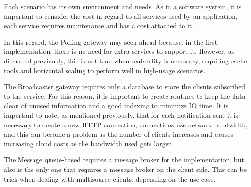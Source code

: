 Each scenario has its own environment and needs. As in a software system, it is important to consider the cost in regard to all services used by an application, each service requires maintenance and has a cost attached to it.

In this regard, the Polling gateway may seen ahead because, in the first implementation, there is no need for extra services to support it. However, as discussed previously, this is not true when scalability is necessary, requiring cache tools and horizontal scaling to perform well in high-usage scenarios.

The Broadcaster gateway requires only a database to store the clients subscribed to the service. For this reason, it is important to create routines to keep the data clean of unused information and a good indexing to minimize IO time. It is important to note, as mentioned previously, that for each notification sent it is necessary to create a new HTTP connection, connections use network bandwidth, and this can become a problem as the number of clients increases and causes increasing cloud costs as the bandwidth used gets larger.

The Message queue-based requires a message broker for the implementation, but also is the only one that requires a message broker on the client side. This can be trick when dealing with multisource clients, depending on the use case.
